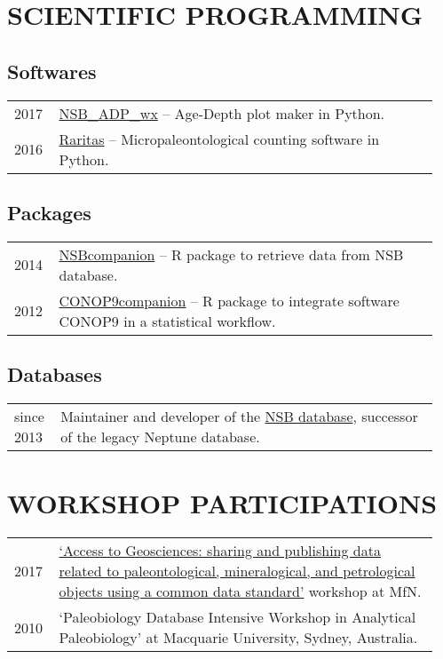 \documentclass[11pt, a4paper]{article}
\begin{document}
\section{SCIENTIFIC PROGRAMMING}
\subsection{Softwares}
\begin{longtable}{p{0.1\linewidth} P{0.85\linewidth}}
2017 & \href{http://github.com/plannapus/NSB_ADP_wx/releases}{NSB\_ADP\_wx} -- Age-Depth plot maker in Python.\\
2016 & \href{http://github.com/plannapus/Raritas/releases}{Raritas} -- Micropaleontological counting software in Python.\\
\end{longtable}
\subsection{Packages}
\begin{longtable}{p{0.1\linewidth} P{0.85\linewidth}}
2014 & \href{http://github.com/plannapus/NSB}{NSBcompanion} -- R package to retrieve data from NSB database.\\
2012 & \href{http://github.com/plannapus/CONOP9companion}{CONOP9companion} -- R package to integrate software CONOP9 in a statistical workflow.\\
\end{longtable}
\subsection{Databases}
\begin{longtable}{p{0.1\linewidth} P{0.85\linewidth}}
since 2013 & Maintainer and developer of the \href{http://nsb-mfn-berlin.de/}{NSB database}, successor of the legacy Neptune database.\\
\end{longtable}

\section{WORKSHOP PARTICIPATIONS}
\begin{longtable}{p{0.1\linewidth} P{0.85\linewidth}}
2017 & \href{https://abcd.biowikifarm.net/wiki/Events:WorkshopEFG2017}{`Access to Geosciences: sharing and publishing data related to paleontological, mineralogical, and petrological objects using a common data standard'} workshop at MfN.\\
2010 & `Paleobiology Database Intensive Workshop in Analytical Paleobiology' at Macquarie University, Sydney, Australia.\\
\end{longtable}
\end{document}
